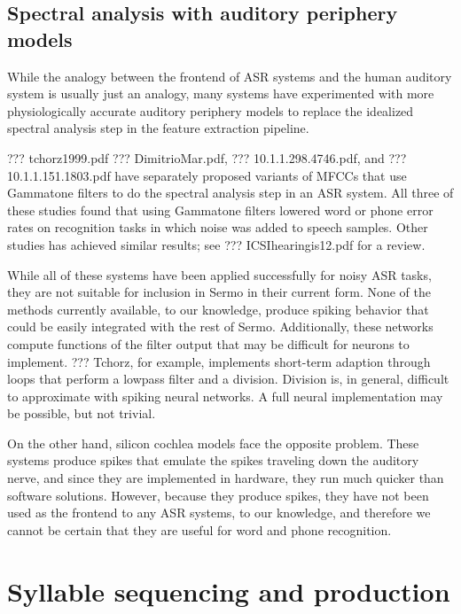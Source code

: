 \subsection{Spectral analysis with auditory periphery models}

While the analogy
between the frontend of ASR systems
and the human auditory system
is usually just an analogy,
many systems have experimented with
more physiologically accurate
auditory periphery models
to replace the idealized spectral analysis step
in the feature extraction pipeline.

??? tchorz1999.pdf
??? DimitrioMar.pdf,
??? 10.1.1.298.4746.pdf,
and ??? 10.1.1.151.1803.pdf
have separately proposed variants of MFCCs
that use Gammatone filters
to do the spectral analysis step in an ASR system.
All three of these studies
found that using Gammatone filters
lowered word or phone error rates
on recognition tasks in which
noise was added to speech samples.
Other studies has achieved similar results;
see ??? ICSIhearingis12.pdf for a review.

While all of these systems
have been applied successfully
for noisy ASR tasks,
they are not suitable
for inclusion in Sermo in their current form.
None of the methods currently available,
to our knowledge, produce spiking behavior
that could
be easily integrated with the rest of Sermo.
Additionally, these networks compute
functions of the filter output that
may be difficult for neurons to implement.
??? Tchorz, for example,
implements short-term adaption
through loops that perform
a lowpass filter and a division.
Division is, in general,
difficult to approximate with spiking neural networks.
A full neural implementation
may be possible,
but not trivial.

On the other hand,
silicon cochlea models face the opposite problem.
These systems produce spikes
that emulate the spikes
traveling down the auditory nerve,
and since they are implemented in hardware,
they run much quicker than software solutions.
However, because they produce spikes,
they have not been used
as the frontend to any ASR systems,
to our knowledge,
and therefore we cannot
be certain that they are useful
for word and phone recognition.

\section{Syllable sequencing and production}

